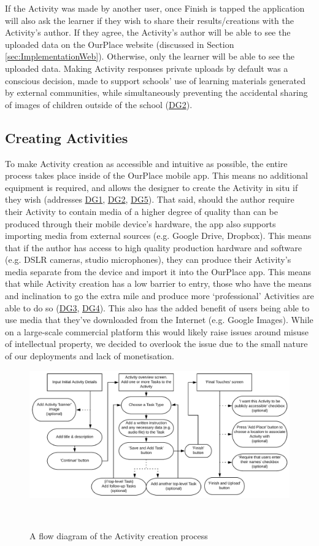 If the Activity was made by another user, once Finish is tapped the application will also ask the learner if they wish to share their results/creations with the Activity's author. If they agree, the Activity's author will be able to see the uploaded data on the OurPlace website (discussed in Section \ref{sec:ImplementationWeb}). Otherwise, only the learner will be able to see the uploaded data. Making Activity responses private uploads by default was a conscious decision, made to support schools' use of learning materials generated by external communities, while simultaneously preventing the accidental sharing of images of children outside of the school (\hyperref[DG2]{DG2}). 

\subsection{Creating Activities}

To make Activity creation as accessible and intuitive as possible, the entire process takes place inside of the OurPlace mobile app. This means no additional equipment is required, and allows the designer to create the Activity in situ if they wish (addresses \hyperref[DG1]{DG1}, \hyperref[DG2]{DG2}, \hyperref[DG5]{DG5}). That said, should the author require their Activity to contain media of a higher degree of quality than can be produced through their mobile device's hardware, the app also supports importing media from external sources (e.g. Google Drive, Dropbox). This means that if the author has access to high quality production hardware and software (e.g. DSLR cameras, studio microphones), they can produce their Activity's media separate from the device and import it into the OurPlace app. This means that while Activity creation has a low barrier to entry, those who have the means and inclination to go the extra mile and produce more `professional' Activities are able to do so (\hyperref[DG3]{DG3}, \hyperref[DG4]{DG4}). This also has the added benefit of users being able to use media that they've downloaded from the Internet (e.g. Google Images). While on a large-scale commercial platform this would likely raise issues around misuse of intellectual property, we decided to overlook the issue due to the small nature of our deployments and lack of monetisation.

\begin{figure}
  \centering
  \includegraphics[width=1\columnwidth]{images/chapter05/CreationFlow.png}
  \caption{A flow diagram of the Activity creation process}~\label{fig:CreationFlow}
\end{figure}

